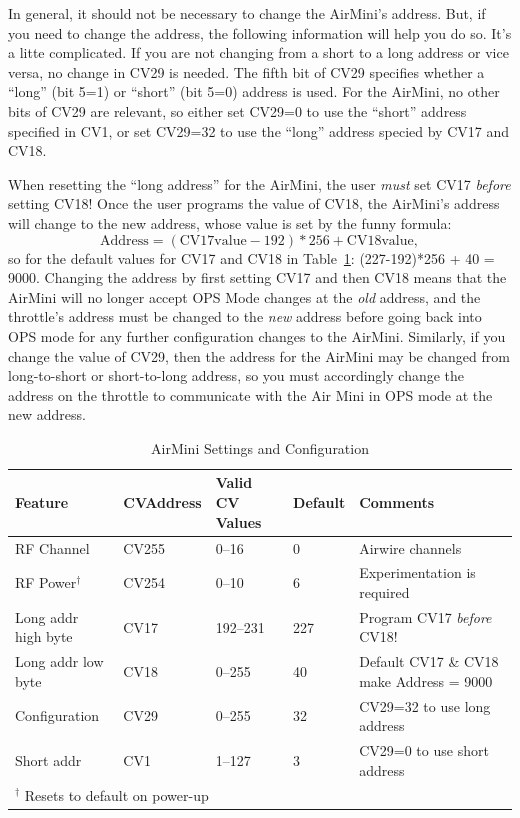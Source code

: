 \documentclass[12pt]{article}
\begin{document}
In general, it should not be necessary to change the AirMini's address.
But, if you need to change the address, the following information will help you do so.
It's a litte complicated.
If you are not changing from a short to a long address or vice versa, no change in CV29 is needed.
The fifth bit of CV29 specifies whether a ``long'' (bit 5=1) or ``short'' (bit 5=0) address is used.
For the AirMini, no other bits of CV29 are relevant, so either set CV29=0 to use the ``short'' address specified in CV1, or set CV29=32 to use the ``long'' address specied by CV17 and CV18.

When resetting the ``long address'' for the AirMini, the user {\em must} set CV17 {\em before} setting CV18! Once the user programs the value of CV18, the AirMini's address will change to the new address, whose value is set by the funny formula:
\[\text{Address} = (\text{CV17value}-192)*256+\text{CV18value},\]
so for the default values for CV17 and CV18 in Table~\ref{lblAirMiniSettings}: (227-192)*256 + 40 = 9000.
Changing the address by first setting CV17 and then CV18 means that the AirMini will no longer accept OPS Mode changes at the {\em old} address, and the throttle's address must be changed to the {\em new} address before going back into OPS mode for any further configuration changes to the AirMini.
Similarly, if you change the value of CV29, then the address for the AirMini may be changed from long-to-short or short-to-long address, so you must accordingly change the address on the throttle to communicate with the Air Mini in OPS mode at the new address.

\begin{table}
\centering
\caption{AirMini Settings and Configuration}
\label{lblAirMiniSettings}
{\small
\begin{tabular}{|llp{40pt}lp{100pt}|}
\hline 
Feature             & CV\newline Address & Valid CV Values & Default & Comments\\
\hline
RF Channel          & CV255              & 0--16           & 0       & Airwire channels \\
RF Power$^\dagger$  & CV254              & 0--10           & 6& Experimentation is required \\
Long addr high byte & CV17               & 192--231        & 227     & Program CV17 {\em before} CV18! \\
Long addr low byte  & CV18               & 0--255          & 40      & Default CV17 \& CV18 make Address = 9000 \\
Configuration       & CV29               & 0--255          & 32      & CV29=32 to use long address \\
Short addr          & CV1                & 1--127          & 3       & CV29=0 to use short address \\
\hline
\multicolumn{5}{|l|}{$^\dagger$ Resets to default on power-up}\\
\hline
\end{tabular}
}%
\end{table}
\end{document}
